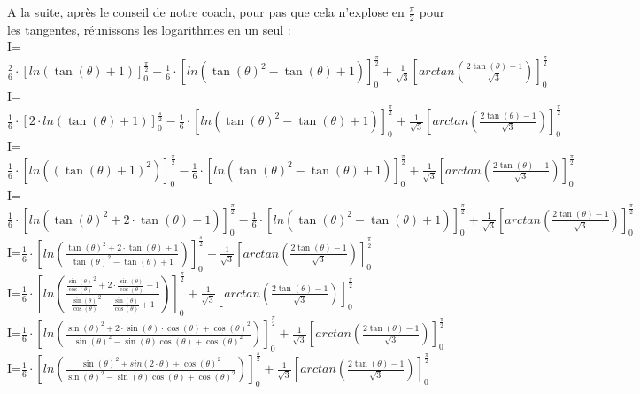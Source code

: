 \documentclass[a4paper,10pt]{article}
\begin{document}
A la suite, après le conseil de notre coach, pour pas que cela n'explose en $\frac{\pi}{2}$ pour les tangentes, réunissons les logarithmes en un seul :\\
I=$\frac{2}{6} \cdot \left[ ln(\tan(\theta)+1) \right]_0^{\frac{\pi}{2}} - \frac{1}{6} \cdot \left[ ln(\tan(\theta)^2-\tan(\theta)+1) \right]_0^{\frac{\pi}{2}} + \frac{1}{\sqrt{3}} \left[ arctan(\frac{2\tan(\theta)-1}{\sqrt{3}}) \right]_0^{\frac{\pi}{2}} $\\
I=$\frac{1}{6} \cdot \left[ 2 \cdot ln(\tan(\theta)+1) \right]_0^{\frac{\pi}{2}} - \frac{1}{6} \cdot \left[ ln(\tan(\theta)^2-\tan(\theta)+1) \right]_0^{\frac{\pi}{2}} + \frac{1}{\sqrt{3}} \left[ arctan(\frac{2\tan(\theta)-1}{\sqrt{3}}) \right]_0^{\frac{\pi}{2}} $\\
I=$\frac{1}{6} \cdot \left[  ln((\tan(\theta)+1)^2) \right]_0^{\frac{\pi}{2}} - \frac{1}{6} \cdot \left[ ln(\tan(\theta)^2-\tan(\theta)+1) \right]_0^{\frac{\pi}{2}} + \frac{1}{\sqrt{3}} \left[ arctan(\frac{2\tan(\theta)-1}{\sqrt{3}}) \right]_0^{\frac{\pi}{2}} $\\
I=$\frac{1}{6} \cdot \left[  ln(\tan(\theta)^2+2 \cdot \tan(\theta)+1) \right]_0^{\frac{\pi}{2}} - \frac{1}{6} \cdot \left[ ln(\tan(\theta)^2-\tan(\theta)+1) \right]_0^{\frac{\pi}{2}} + \frac{1}{\sqrt{3}} \left[ arctan(\frac{2\tan(\theta)-1}{\sqrt{3}}) \right]_0^{\frac{\pi}{2}} $\\
I=$\frac{1}{6} \cdot \left[ ln(\frac{\tan(\theta)^2+2 \cdot \tan(\theta)+1}{\tan(\theta)^2-\tan(\theta)+1}) \right]_0^{\frac{\pi}{2}} + \frac{1}{\sqrt{3}} \left[ arctan(\frac{2\tan(\theta)-1}{\sqrt{3}}) \right]_0^{\frac{\pi}{2}} $\\
I=$\frac{1}{6} \cdot \left[ ln(\frac{\frac{\sin(\theta)}{\cos(\theta)}^2+2 \cdot \frac{\sin(\theta)}{\cos(\theta)}+1}{\frac{\sin(\theta)}{\cos(\theta)}^2-\frac{\sin(\theta)}{\cos(\theta)}+1}) \right]_0^{\frac{\pi}{2}} + \frac{1}{\sqrt{3}} \left[ arctan(\frac{2\tan(\theta)-1}{\sqrt{3}}) \right]_0^{\frac{\pi}{2}} $\\
I=$\frac{1}{6} \cdot \left[ ln(\frac{\sin(\theta)^2+2 \cdot \sin(\theta) \cdot \cos(\theta)+ \cos(\theta)^2}{\sin(\theta)^2-\sin(\theta)\cos(\theta)+\cos(\theta)^2}) \right]_0^{\frac{\pi}{2}} + \frac{1}{\sqrt{3}} \left[ arctan(\frac{2\tan(\theta)-1}{\sqrt{3}}) \right]_0^{\frac{\pi}{2}} $\\
I=$\frac{1}{6} \cdot \left[ ln(\frac{\sin(\theta)^2+ sin(2 \cdot \theta)+ \cos(\theta)^2}{\sin(\theta)^2-\sin(\theta)\cos(\theta)+\cos(\theta)^2}) \right]_0^{\frac{\pi}{2}} + \frac{1}{\sqrt{3}} \left[ arctan(\frac{2\tan(\theta)-1}{\sqrt{3}}) \right]_0^{\frac{\pi}{2}} $\\
\end{document}
